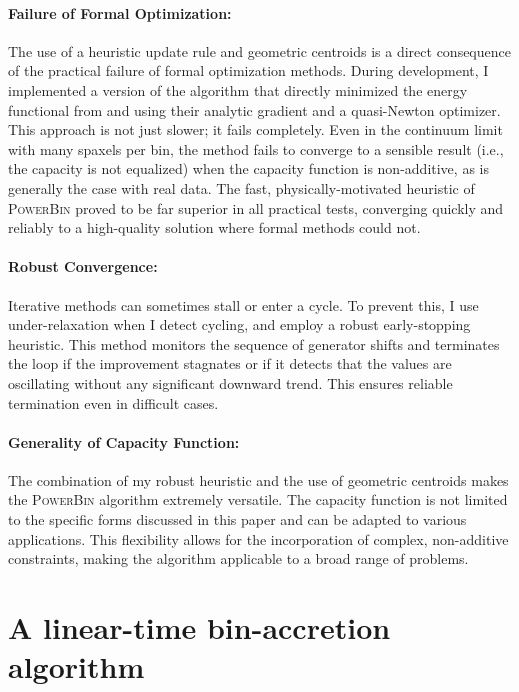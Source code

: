 \documentclass[fleqn,usenatbib]{mnras}
\begin{document}
\paragraph*{Failure of Formal Optimization:}
The use of a heuristic update rule and geometric centroids is a direct consequence of the practical failure of formal optimization methods. During development, I implemented a version of the algorithm that directly minimized the energy functional from \citet{Aurenhammer1998} and \citet{DeGoes2012} using their analytic gradient and a quasi-Newton optimizer. This approach is not just slower; it fails completely. Even in the continuum limit with many spaxels per bin, the method fails to converge to a sensible result (i.e., the capacity is not equalized) when the capacity function is non-additive, as is generally the case with real data. The fast, physically-motivated heuristic of \textsc{PowerBin} proved to be far superior in all practical tests, converging quickly and reliably to a high-quality solution where formal methods could not.

\paragraph*{Robust Convergence:}
Iterative methods can sometimes stall or enter a cycle. To prevent this, I use under-relaxation when I detect cycling, and employ a robust early-stopping heuristic. This method monitors the sequence of generator shifts and terminates the loop if the improvement stagnates or if it detects that the values are oscillating without any significant downward trend. This ensures reliable termination even in difficult cases.

\paragraph*{Generality of Capacity Function:}
The combination of my robust heuristic and the use of geometric centroids makes the \textsc{PowerBin} algorithm extremely versatile. The capacity function is not limited to the specific forms discussed in this paper and can be adapted to various applications. This flexibility allows for the incorporation of complex, non-additive constraints, making the algorithm applicable to a broad range of problems.

\section{A linear-time bin-accretion algorithm}
\label{sec:accretion}
\end{document}
